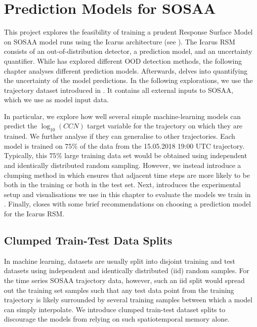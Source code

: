 \chapter{Prediction Models for SOSAA} \label{txt:prediction-chapter}

This project explores the feasibility of training a prudent Response Surface Model on SOSAA model runs using the Icarus architecture (see ). The Icarus RSM consists of an out-of-distribution detector, a prediction model, and an uncertainty quantifier. While  has explored different OOD detection methods, the following chapter analyses different prediction models. Afterwards,  delves into quantifying the uncertainty of the model predictions. In the following explorations, we use the trajectory dataset introduced in . It contains all external inputs to SOSAA, which we use as model input data.

In particular, we explore how well several simple machine-learning models can predict the $\log_{10}(CCN)$ target variable for the trajectory on which they are trained. We further analyse if they can generalise to other trajectories. Each model is trained on $75\%$ of the data from the 15.05.2018 19:00 UTC trajectory. Typically, this $75\%$ large training data set would be obtained using independent and identically distributed random sampling. However, we instead introduce a clumping method in  which ensures that adjacent time steps are more likely to be both in the training or both in the test set. Next,  introduces the experimental setup and visualisations we use in this chapter to evaluate the models we train in . Finally,  closes with some brief recommendations on choosing a prediction model for the Icarus RSM.

\section{Clumped Train-Test Data Splits} \label{txt:clumped-train-test-split}

In machine learning, datasets are usually split into disjoint training and test datasets using independent and identically distributed (iid) random samples. For the time series SOSAA trajectory data, however, such an iid split would spread out the training set samples such that any test data point from the training trajectory is likely surrounded by several training samples between which a model can simply interpolate. We introduce clumped train-test dataset splits to discourage the models from relying on such spatiotemporal memory alone.

